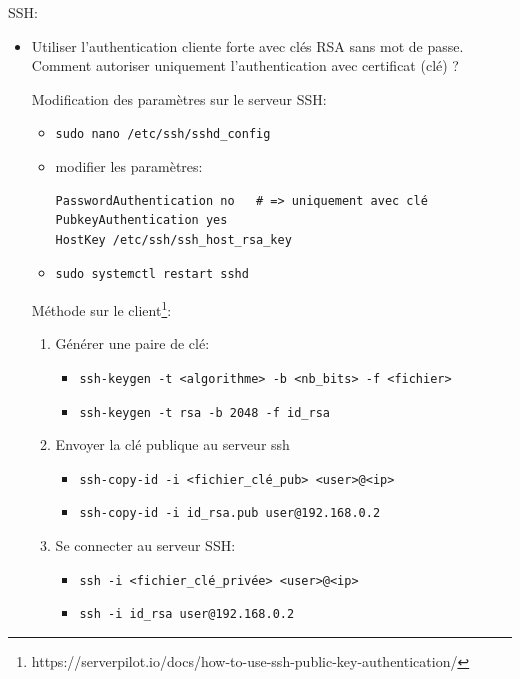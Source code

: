 \documentclass[a4paper]{article}
\begin{document}
SSH:
\begin{itemize}

\item Utiliser l'authentication cliente forte avec clés RSA sans mot de passe. Comment autoriser uniquement l'authentication avec certificat (clé) ?
\begin{example}
    Modification des paramètres sur le serveur SSH:
    \begin{itemize}
        \item \texttt{sudo nano /etc/ssh/sshd\_config}
        \item modifier les paramètres:
        \begin{verbatim}
PasswordAuthentication no   # => uniquement avec clé
PubkeyAuthentication yes
HostKey /etc/ssh/ssh_host_rsa_key
        \end{verbatim}
        \item \texttt{sudo systemctl restart sshd}
    \end{itemize}
    Méthode sur le client\footnote{https://serverpilot.io/docs/how-to-use-ssh-public-key-authentication/}:
    \begin{enumerate}
        \item Générer une paire de clé:
        \begin{itemize}
            \item \texttt{ssh-keygen -t <algorithme> -b <nb\_bits> -f <fichier>}
            \item \texttt{ssh-keygen -t rsa -b 2048 -f id\_rsa}
        \end{itemize}
        \item Envoyer la clé publique au serveur ssh
        \begin{itemize}
            \item \texttt{ssh-copy-id -i <fichier\_clé\_pub> <user>@<ip>}
            \item \texttt{ssh-copy-id -i id\_rsa.pub user@192.168.0.2}
        \end{itemize}
        \item Se connecter au serveur SSH:
        \begin{itemize}
            \item \texttt{ssh -i <fichier\_clé\_privée> <user>@<ip>}
            \item \texttt{ssh -i id\_rsa user@192.168.0.2}
        \end{itemize}
    \end{enumerate}
\end{example}


\end{itemize}
\end{document}
